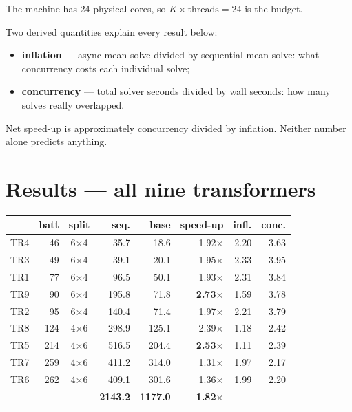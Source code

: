 \documentclass[11pt,a4paper]{article}
\newcommand{\gd}[1]{\textcolor{good}{#1}}
\newcommand{\bd}[1]{\textcolor{uaired}{#1}}
\begin{document}
The machine has 24 physical cores, so $K \times \text{threads} = 24$ is the budget.

Two derived quantities explain every result below:

\begin{itemize}
  \item \textbf{inflation} --- async mean solve divided by sequential mean solve:
        what concurrency costs each individual solve;
  \item \textbf{concurrency} --- total solver seconds divided by wall seconds:
        how many solves really overlapped.
\end{itemize}

Net speed-up is approximately concurrency divided by inflation. Neither number
alone predicts anything.

\section{Results --- all nine transformers}

\begin{center}
\begin{tabular}{@{}l r c r r r r r@{}}
\toprule
 & \textbf{batt} & \textbf{split} & \textbf{seq.} & \textbf{base} & \textbf{speed-up} & \textbf{infl.} & \textbf{conc.} \\
\midrule
TR4 &  46 & 6$\times$4 &  35.7 &  18.6 & 1.92$\times$ & 2.20 & 3.63 \\
TR3 &  49 & 6$\times$4 &  39.1 &  20.1 & 1.95$\times$ & 2.33 & 3.95 \\
TR1 &  77 & 6$\times$4 &  96.5 &  50.1 & 1.93$\times$ & 2.31 & 3.84 \\
TR9 &  90 & 6$\times$4 & 195.8 &  71.8 & \gd{\textbf{2.73$\times$}} & 1.59 & 3.78 \\
TR2 &  95 & 6$\times$4 & 140.4 &  71.4 & 1.97$\times$ & 2.21 & 3.79 \\
TR8 & 124 & 4$\times$6 & 298.9 & 125.1 & 2.39$\times$ & 1.18 & 2.42 \\
TR5 & 214 & 4$\times$6 & 516.5 & 204.4 & \gd{\textbf{2.53$\times$}} & 1.11 & 2.39 \\
TR7 & 259 & 4$\times$6 & 411.2 & 314.0 & \bd{1.31$\times$} & 1.97 & 2.17 \\
TR6 & 262 & 4$\times$6 & 409.1 & 301.6 & \bd{1.36$\times$} & 1.99 & 2.20 \\
\midrule
 & & & \textbf{2143.2} & \textbf{1177.0} & \textbf{1.82$\times$} & & \\
\bottomrule
\end{tabular}
\end{center}
\end{document}
